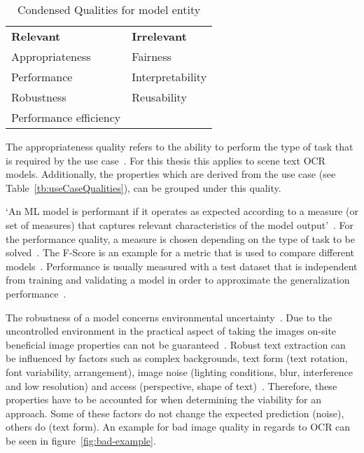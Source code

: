 \begin{table}[h]\label{tb:condensedQualities}
    \centering\scriptsize
    \begin{tabular}{l l}
        \textbf{Relevant}                & \textbf{Irrelevant} \\
        Appropriateness         & Fairness  \\
        Performance             & Interpretability \\
        Robustness              & Reusability \\
        Performance efficiency  & \\
    \end{tabular}
    \caption{Condensed Qualities for model entity}
\end{table}

The appropriateness quality refers to the ability to perform the type of task that is required by
the use case~\citep{siebert_construction_2021,nakamichi_requirements-driven_2020}.
For this thesis this applies to scene text \ac{OCR} models.
Additionally, the properties which are derived from the use case (see Table~\ref{tb:useCaseQualities}),
can be grouped under this quality.

`An ML model is performant if it operates as expected according to a measure (or set of measures)
that captures relevant characteristics of the model output'~\citep{ashmore_assuring_2021}.
For the performance quality, a measure is chosen depending on the type of task to be
solved~\citep{siebert_construction_2021}.
The F-Score is an example for a metric that is used to compare different
models~\cite{chen_text_2021, long_scene_2021}.
Performance is usually measured with a test dataset that is independent from training and validating
a model in order to approximate the generalization performance~\cite{goodfellow_deep_2016,
nakamichi_requirements-driven_2020}.

The robustness of a model concerns environmental uncertainty~\cite{ashmore_assuring_2021}.
Due to the uncontrolled environment in the practical aspect of taking the images on-site
beneficial image properties can not be guaranteed~\citep{chen_text_2021}.
Robust text extraction can be influenced by factors such as complex backgrounds, text form
(text rotation, font variability, arrangement), image noise (lighting conditions, blur,
interference and low resolution) and access (perspective, shape of
text)~\citep{oyedotun_deep_2015,ghosh_visual_2017,chen_text_2021}.
Therefore, these properties have to be accounted for when determining the viability for an approach.
Some of these factors do not change the expected prediction (noise), others do (text
form)\cite{hu_towards_2020}.
An example for bad image quality in regards to \ac{OCR} can be seen in figure~\ref{fig:bad-example}.

